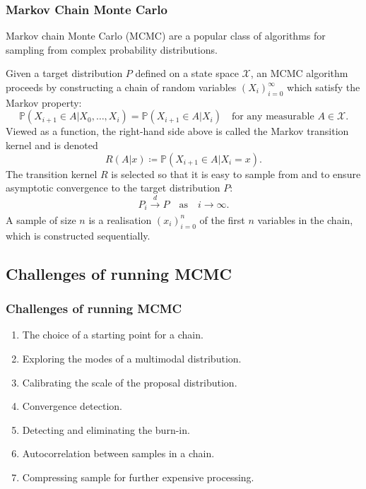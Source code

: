 \documentclass{beamer}
\begin{document}
\begin{frame}
\frametitle{Markov Chain Monte Carlo}
Markov chain Monte Carlo (MCMC) are a popular class of algorithms for sampling from complex probability distributions.

Given a target distribution $P$ defined on a state space $\mathcal{X}$, an MCMC algorithm proceeds by constructing a chain of random variables $(X_i)_{i=0}^\infty$  which satisfy the Markov property:
\begin{equation*}
\mathbb{P}(X_{i+1}\in A | X_0, \dots, X_i) = \mathbb{P}(X_{i+1}\in A | X_i) \quad\text{for any measurable } A \in \mathcal{X}.
\end{equation*}
Viewed as a function, the right-hand side above is called the Markov transition kernel and is denoted 
\begin{equation*}
R(A | x) \coloneq \mathbb{P}(X_{i+1}\in A | X_i = x).
\end{equation*}
The transition kernel $R$ is selected so that it is easy to sample from and to ensure asymptotic convergence to the target distribution $P$:
\begin{equation*}
P_i \xrightarrow[]{d} P \quad\text{as}\quad i \to \infty.
\end{equation*}
A sample of size $n$ is a realisation $(x_i)_{i=0}^n$ of the first $n$ variables in the chain, which is constructed sequentially.
\end{frame}

\subsection{Challenges of running MCMC}

\begin{frame}
\frametitle{Challenges of running MCMC}

\begin{enumerate}
\item The choice of a starting point for a chain.
\item Exploring the modes of a multimodal distribution.
\item Calibrating the scale of the proposal distribution.
\item Convergence detection.
\item Detecting and eliminating the burn-in.
\item Autocorrelation between samples in a chain.
\item Compressing sample for further expensive processing.
\end{enumerate}

\end{frame}
\end{document}
